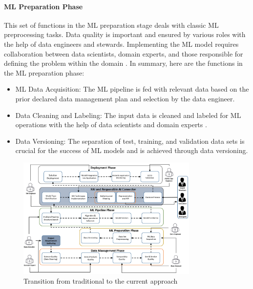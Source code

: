 \documentclass[conference]{IEEEtran}
\begin{document}
\paragraph{ML Preparation Phase} This set of functions in the ML preparation stage deals with classic ML preprocessing tasks. Data quality is important and ensured by various roles with the help of data engineers and stewards. Implementing the ML model requires collaboration between data scientists, domain experts, and those responsible for defining the problem within the domain \cite{treveil2020introducing}. In summary, here are the functions in the ML preparation phase:
\begin{itemize}
	\item ML Data Acquisition: The ML pipeline is fed with relevant data based on the prior declared data management plan and selection by the data engineer.
	\item Data Cleaning and Labeling: The input data is cleaned and labeled for ML operations with the help of data scientists and domain experts \cite{taleb2018big}.
	\item Data Versioning: The separation of test, training, and validation data sets is crucial for the success of ML models and is achieved through data versioning.
\end{itemize}

\begin{figure}[h!]
	\centering
	\includegraphics[width=0.8\textwidth]{ML-OPS_with_XAI.png}
	\caption{Transition from traditional to the current approach}
	\label{XRc-phase}
\end{figure}
\end{document}
